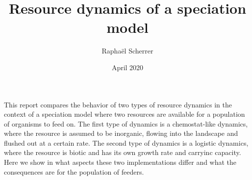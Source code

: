 \documentclass{article}
\title{Resource dynamics of a speciation model}
\author{Raphaël Scherrer}
\date{April 2020}
\begin{document}
\maketitle

This report compares the behavior of two types of resource dynamics in the context of a speciation model where two resources are available for a population of organisms to feed on. The first type of dynamics is a chemostat-like dynamics, where the resource is assumed to be inorganic, flowing into the landscape and flushed out at a certain rate. The second type of dynamics is a logistic dynamics, where the resource is biotic and has its own growth rate and carryinc capacity. Here we show in what aspects these two implementations differ and what the consequences are for the population of feeders.
\end{document}
